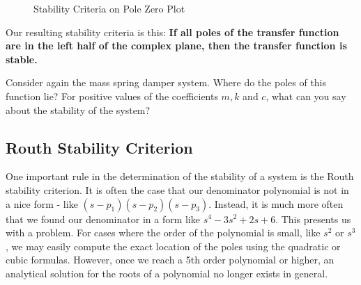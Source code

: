 \begin{figure}
    \caption{Stability Criteria on Pole Zero Plot}
    \label{fig:pole zero stability}
\end{figure}
Our resulting stability criteria is this: \textbf{If all poles of the transfer function are in the left half of the complex plane, then the transfer function is stable.}

\newpage
\begin{exercise}
Consider again the mass spring damper system. Where do the poles of this function lie? For positive values of the coefficients $m,k$ and $c$, what can you say about the stability of the system?
\end{exercise}

\subsection{Routh Stability Criterion}
    
One important rule in the determination of the stability of a system is the Routh stability criterion. It is often the case that our denominator polynomial is not in a nice form - like $(s-p_1)(s-p_2)(s-p_3)$. Instead, it is much more often that we found our denominator in a form like $s^4-3s^2+2s+6$. This presents us with a problem. For cases where the order of the polynomial is small, like $s^2$ or $s^3$, we may easily compute the exact location of the poles using the quadratic or cubic formulas. However, once we reach a 5th order polynomial or higher, an analytical solution for the roots of a polynomial no longer exists in general. 

